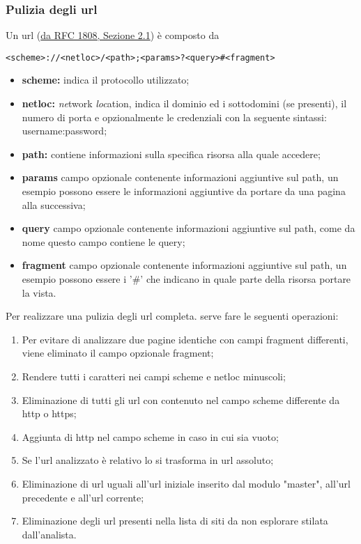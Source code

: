 \subsubsection{Pulizia degli url}
Un url (\href{https://datatracker.ietf.org/doc/html/rfc1808.html#section-2.1}{da RFC 1808, Sezione 2.1}) è composto da \newline
\centerline{\texttt{<scheme>://<netloc>/<path>;<params>?<query>\#<fragment>}}
\newline
\begin{itemize}
	\item \textbf{scheme:} indica il protocollo utilizzato;
	\item \textbf{netloc:} \textit{ne}twork \textit{loc}ation, indica il dominio ed i sottodomini (se presenti), il numero di porta e opzionalmente le credenziali con la seguente sintassi: username:password;
	\item \textbf{path:} contiene informazioni sulla specifica risorsa alla quale accedere;
	\item \textbf{params} campo opzionale contenente informazioni aggiuntive sul path, un esempio possono essere le informazioni aggiuntive da portare da una pagina alla successiva;
	\item \textbf{query} campo opzionale contenente informazioni aggiuntive sul path, come da nome questo campo contiene le query;
	\item \textbf{fragment} campo opzionale contenente informazioni aggiuntive sul path, un esempio possono essere i '\#' che indicano in quale parte della risorsa portare la vista.
\end{itemize}
\noindent
Per realizzare una pulizia degli url completa. serve fare le seguenti operazioni:
\begin{enumerate}
	\item Per evitare di analizzare due pagine identiche con campi fragment differenti, viene eliminato il campo opzionale fragment;
	\item Rendere tutti i caratteri nei campi scheme e netloc minuscoli;
	\item Eliminazione di tutti gli url con contenuto nel campo scheme differente da http o https;
	\item Aggiunta di http nel campo scheme in caso in cui sia vuoto;
	\item Se l'url analizzato è relativo lo si trasforma in url assoluto;
	\item Eliminazione di url uguali all'url iniziale inserito dal modulo "master", all'url precedente e all'url corrente;
	\item Eliminazione degli url presenti nella lista di siti da non esplorare stilata dall'analista.
\end{enumerate}

